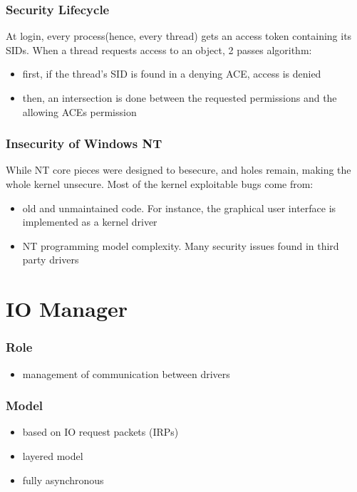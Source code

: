 
\begin{frame}
  \frametitle{Security Lifecycle}

  At login, every process(hence, every thread) gets an access token containing its SIDs.
  When a thread requests access to an object, 2 passes algorithm:

  \begin{itemize}
    \item
      first, if the thread's SID is found in a denying ACE, access is denied
    \item
      then, an intersection is done between the requested permissions and the allowing ACEs permission
  \end{itemize}
\end{frame}


\begin{frame}
  \frametitle{Insecurity of Windows NT}

  While NT core pieces were designed to besecure,  and 
  holes remain, making the whole kernel unsecure. Most of the kernel exploitable bugs come from:

  \begin{itemize}
    \item
      old and unmaintained code. For instance, the graphical user interface is implemented as a kernel driver
    \item
      NT programming model complexity. Many security issues found in third party drivers
  \end{itemize}

\end{frame}


%
%

\section{IO Manager}


\begin{frame}
 \frametitle{Role}
 \begin{itemize}
  \item
    management of communication between drivers
 \end{itemize}
\end{frame}


\begin{frame}
 \frametitle{Model}
 \begin{itemize}
  \item
    based on IO request packets (IRPs)
  \item
    layered model
  \item
    fully asynchronous
 \end{itemize}
\end{frame}

